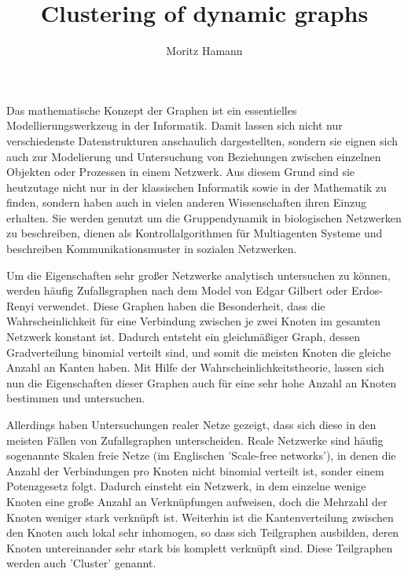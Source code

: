 \documentclass[journal]{vgtc}
\author{Moritz Hamann}
\title{Clustering of dynamic graphs}
\begin{document}

\maketitle

  Das mathematische Konzept der Graphen ist ein essentielles 
  Modellierungswerkzeug in der Informatik. Damit lassen sich nicht nur
  verschiedenste Datenstrukturen anschaulich dargestellten, sondern
  sie eignen sich auch zur Modelierung und Untersuchung von Beziehungen zwischen einzelnen
  Objekten oder Prozessen in einem Netzwerk.
  Aus diesem Grund sind sie heutzutage nicht nur in der klassischen Informatik
  sowie in der Mathematik zu finden, sondern haben auch in vielen anderen
  Wissenschaften ihren Einzug erhalten. Sie werden genutzt um die
  Gruppendynamik in biologischen Netzwerken zu beschreiben, dienen
  als Kontrollalgorithmen für Multiagenten Systeme \cite{graphcontrol} und beschreiben
  Kommunikationsmuster in sozialen Netzwerken.
  
  Um die Eigenschaften sehr großer Netzwerke analytisch untersuchen zu können,
  werden häufig Zufallsgraphen nach dem Model von Edgar Gilbert oder
  Erdos-Renyi verwendet. Diese Graphen haben die Besonderheit, dass die 
  Wahrscheinlichkeit für eine Verbindung zwischen je zwei Knoten im 
  gesamten Netzwerk konstant ist. Dadurch entsteht ein gleichmäßiger Graph,
  dessen Gradverteilung binomial verteilt sind, und somit die meisten Knoten 
  die gleiche Anzahl an Kanten haben. Mit Hilfe der Wahrscheinlichkeitstheorie,
  lassen sich nun die Eigenschaften dieser Graphen auch für eine sehr hohe Anzahl
  an Knoten bestimmen und untersuchen.
  
  Allerdings haben Untersuchungen realer Netze gezeigt, dass sich
  diese in den meisten Fällen von Zufallsgraphen unterscheiden. Reale Netzwerke sind
  häufig sogenannte Skalen freie Netze (im Englischen 'Scale-free networks'), in 
  denen die Anzahl der Verbindungen pro Knoten nicht binomial verteilt ist, sonder einem
  Potenzgesetz folgt. Dadurch einsteht ein Netzwerk, in dem einzelne wenige Knoten eine große
  Anzahl an Verknüpfungen aufweisen, doch die Mehrzahl der Knoten weniger stark verknüpft ist. 
  Weiterhin ist die Kantenverteilung zwischen den Knoten auch lokal sehr inhomogen, so dass sich 
  Teilgraphen ausbilden, deren Knoten untereinander sehr stark bis komplett verknüpft sind.
  Diese Teilgraphen werden auch 'Cluster' genannt.
\end{document}
